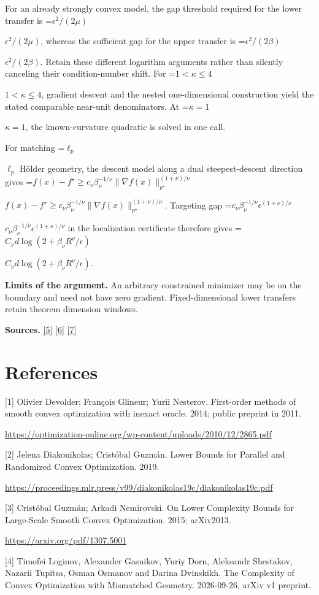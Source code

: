 \documentclass[10pt,a4paper]{article}
\newcommand{\AtlasMath}[1]{\par\begingroup\centering\setbox0=\hbox{$\displaystyle #1$}\ifdim\wd0>1.4\linewidth\typeout{ATLAS WIDE FORMULA: \the\wd0}\fi\ifdim\wd0>\linewidth\resizebox{\linewidth}{!}{\box0}\else\box0\fi\par\endgroup}
\newcommand{\AtlasInlineMath}[1]{\begingroup\setbox0=\hbox{$#1$}\ifdim\wd0>.4\linewidth\endgroup\AtlasMath{#1}\else\endgroup$#1$\fi}
\begin{document}
For an already strongly convex model, the gap threshold required for the lower transfer is \AtlasInlineMath{\epsilon^2/(2\mu)}, whereas the sufficient gap for the upper transfer is \AtlasInlineMath{\epsilon^2/(2\beta)}. Retain these different logarithm arguments rather than silently canceling their condition-number shift. For \AtlasInlineMath{1<\kappa\le4}, gradient descent and the nested one-dimensional construction yield the stated comparable near-unit denominators. At \AtlasInlineMath{\kappa=1}, the known-curvature quadratic is solved in one call.

For matching \AtlasInlineMath{\ell_p} Hölder geometry, the descent model along a dual steepest-descent direction gives
\AtlasInlineMath{f(x)-f^\star\ge c_\nu\beta_\nu^{-1/\nu}\|\nabla f(x)\|_{p^\star}^{(1+\nu)/\nu}}.
Targeting gap \AtlasInlineMath{c_\nu\beta_\nu^{-1/\nu}\epsilon^{(1+\nu)/\nu}} in the localization certificate therefore gives
\AtlasInlineMath{C_\nu d\log(2+\beta_\nu R^\nu/\epsilon)}.

\textbf{Limits of the argument.} An arbitrary constrained minimizer may be on the boundary and need not have zero gradient. Fixed-dimensional lower transfers retain theorem dimension windows.

\textbf{Sources.} \href{https://arxiv.org/pdf/2101.09740v2}{[5]} \href{https://arxiv.org/pdf/2609.33360v2}{[6]} \href{https://arxiv.org/pdf/2609.10874}{[7]}

\section{References}
[1] Olivier Devolder; François Glineur; Yurii Nesterov. First-order methods of smooth convex optimization with inexact oracle. 2014; public preprint in 2011.

\url{https://optimization-online.org/wp-content/uploads/2010/12/2865.pdf}

[2] Jelena Diakonikolas; Cristóbal Guzmán. Lower Bounds for Parallel and Randomized Convex Optimization. 2019.

\url{https://proceedings.mlr.press/v99/diakonikolas19c/diakonikolas19c.pdf}

[3] Cristóbal Guzmán; Arkadi Nemirovski. On Lower Complexity Bounds for Large-Scale Smooth Convex Optimization. 2015; arXiv2013.

\url{https://arxiv.org/pdf/1307.5001}

[4] Timofei Loginov, Alexander Gasnikov, Yuriy Dorn, Aleksandr Shestakov, Nazarii Tupitsa, Osman Osmanov and Darina Dvinskikh. The Complexity of Convex Optimization with Mismatched Geometry. 2026-09-26, arXiv v1 preprint.
\end{document}
